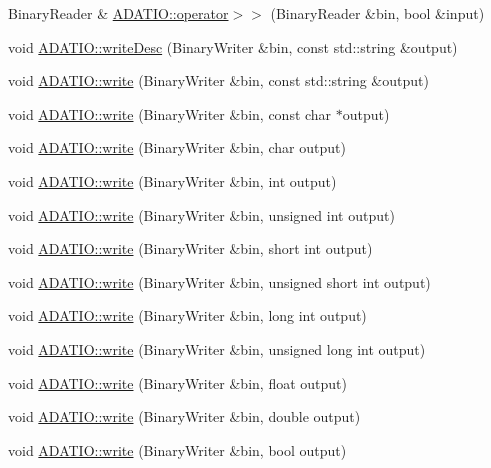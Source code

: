\begin{DoxyCompactItemize}
\item 
Binary\+Reader \& \mbox{\hyperlink{namespaceADATIO_a540603b862dd578f7d9e187b2a0b7380}{A\+D\+A\+T\+I\+O\+::operator$>$$>$}} (Binary\+Reader \&bin, bool \&input)
\item 
void \mbox{\hyperlink{namespaceADATIO_a0faeed900aacb29febaa709323135c50}{A\+D\+A\+T\+I\+O\+::write\+Desc}} (Binary\+Writer \&bin, const std\+::string \&output)
\item 
void \mbox{\hyperlink{namespaceADATIO_a12d01adc4b592d85f0f5f5c101205c08}{A\+D\+A\+T\+I\+O\+::write}} (Binary\+Writer \&bin, const std\+::string \&output)
\item 
void \mbox{\hyperlink{namespaceADATIO_a7a53460de240b5544de0b7c60b2eb455}{A\+D\+A\+T\+I\+O\+::write}} (Binary\+Writer \&bin, const char $\ast$output)
\item 
void \mbox{\hyperlink{namespaceADATIO_a36dc30e1303b7d207fefebf8d5d5eb6e}{A\+D\+A\+T\+I\+O\+::write}} (Binary\+Writer \&bin, char output)
\item 
void \mbox{\hyperlink{namespaceADATIO_acd8820f167370337965f2788946e6cd1}{A\+D\+A\+T\+I\+O\+::write}} (Binary\+Writer \&bin, int output)
\item 
void \mbox{\hyperlink{namespaceADATIO_a4414db50c6a20ca89996529421eb8d0b}{A\+D\+A\+T\+I\+O\+::write}} (Binary\+Writer \&bin, unsigned int output)
\item 
void \mbox{\hyperlink{namespaceADATIO_a89bfc18eb2d40012f5b4ac105448d441}{A\+D\+A\+T\+I\+O\+::write}} (Binary\+Writer \&bin, short int output)
\item 
void \mbox{\hyperlink{namespaceADATIO_aed0610520a88cb6c8ba3cfd5b9ea2a8f}{A\+D\+A\+T\+I\+O\+::write}} (Binary\+Writer \&bin, unsigned short int output)
\item 
void \mbox{\hyperlink{namespaceADATIO_a163945e3b7a7ffeb94176c87d14dd21d}{A\+D\+A\+T\+I\+O\+::write}} (Binary\+Writer \&bin, long int output)
\item 
void \mbox{\hyperlink{namespaceADATIO_a68445b40d5732188a488e7b95b3cc6cc}{A\+D\+A\+T\+I\+O\+::write}} (Binary\+Writer \&bin, unsigned long int output)
\item 
void \mbox{\hyperlink{namespaceADATIO_a0bd8eac36791c194c12fd2005d87046d}{A\+D\+A\+T\+I\+O\+::write}} (Binary\+Writer \&bin, float output)
\item 
void \mbox{\hyperlink{namespaceADATIO_adc3666e3bf7803200f6dbd4eb96463fb}{A\+D\+A\+T\+I\+O\+::write}} (Binary\+Writer \&bin, double output)
\item 
void \mbox{\hyperlink{namespaceADATIO_a936b2163d1c60aa98f39841bed52f62a}{A\+D\+A\+T\+I\+O\+::write}} (Binary\+Writer \&bin, bool output)

\end{DoxyCompactItemize}
